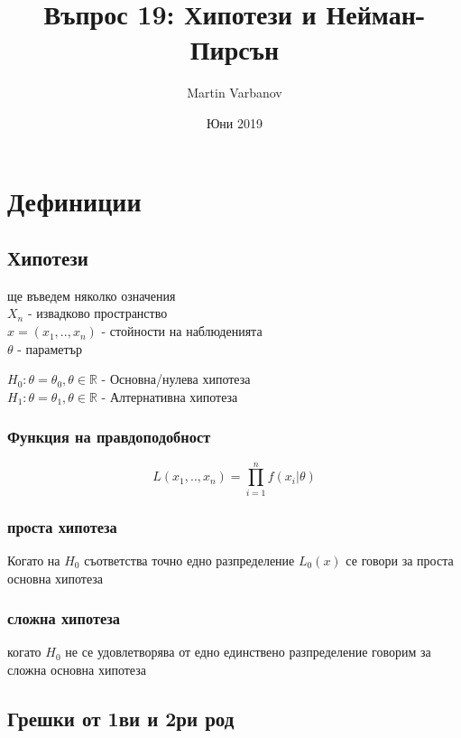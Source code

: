 \documentclass{article}
\begin{document}
\title{Въпрос 19: Хипотези и Нейман-Пирсън}
\author{Martin Varbanov}
\date{Юни 2019}
\maketitle

\section{Дефиниции}

\subsection{Хипотези}

ще въведем няколко означения \\

$X_n$ - извадково пространство \\

$x=(x_1,..,x_n)$ - стойности на наблюденията \\

$\theta$ - параметър

$H_0 : \theta = \theta_0, \theta \in \mathbb{R}$ - Основна/нулева хипотеза \\

$H_1 : \theta = \theta_1, \theta \in \mathbb{R}$ - Алтернативна хипотеза \\



\subsubsection{Функция на правдоподобност}
$$L(x_1,..,x_n) = \prod_{i=1}^n f(x_i | \theta)$$


\subsubsection{проста хипотеза}
Когато на $H_0$ съответства точно едно разпределение $L_0(x)$ се говори за проста основна хипотеза

\subsubsection{сложна хипотеза}
когато $H_0$ не се удовлетворява от едно единствено разпределение говорим за сложна основна хипотеза




\subsection{Грешки от 1ви и 2ри род}
\end{document}
